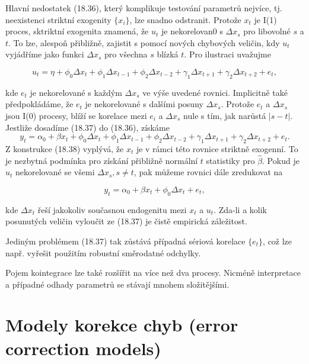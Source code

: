 Hlavní nedostatek (18.36), který komplikuje testování parametrů nejvíce, tj. neexistenci striktní exogenity 
$\{x_i\}$, lze snadno odstranit. Protože $x_t$ je I(1) proces, sktriktní exogenita znamená, že $u_t$ je 
nekorelovan0 s $\Delta x_s$ pro libovolné $s$ a $t$. To lze, alespoň přibližně, zajistit s pomocí nových 
chybových veličin, kdy $u_t$ vyjádříme jako funkci $\Delta x_s$ pro všechna $s$ blízká $t$. Pro ilustraci uvažujme

\begin{equation}
u_t = \eta + \phi_0 \Delta x_t + \phi_1 \Delta x_{t - 1} + \phi_2 \Delta x_{t - 2} + \gamma_1 \Delta x_{t + 1} + \gamma_2 \Delta x_{t + 2} + e_t,
\end{equation}

kde $e_t$ je nekorelované s každým $\Delta x_s$ ve výše uvedené rovnici. Implicitně také předpokládáme, že $e_t$ je nekorelované s 
dalšími posuny $\Delta x_s$. Protože $e_t$ a $\Delta x_s$ jsou I(0) procesy, blíží se korelace mezi $e_i$ a 
$\Delta x_s$ nule s tím, jak narůstá $|s - t|$. Jestliže dosadíme (18.37) do (18.36), získáme
\begin{equation}
y_t = \alpha_0 + \beta x_t + \phi_0 \Delta x_t + \phi_1 \Delta x_{t - 1} + \phi_2 \Delta x_{t - 2} + \gamma_1 \Delta 
x_{t + 1} + \gamma_2 \Delta x_{t + 2} + e_t.
\end{equation}
Z konstrukce (18.38) vyplývá, že $x_t$ je v rámci této rovnice striktně exogenní. To je nezbytná podmínka pro 
získání přibližně normální $t$ statistiky pro $\hat{\beta}$. Pokud je $u_t$ nekorelované se všemi $\Delta 
x_s, s \ne t$, pak můžeme rovnici dále zredukovat na

\begin{equation}
y_t = \alpha_0 + \beta x_t + \phi_0 \Delta x_t + e_t,
\end{equation}

kde $\Delta x_t$ řeší jakokoliv současnou endogenitu mezi $x_t$ a $u_t$. Zda-li a kolik posunutých veličin 
vyloučit ze (18.37) je čistě empirická záležitost.

Jediným problémem (18.37) tak zůstává případná sériová korelace $\{e_t\}$, což lze např. vyřešit použitím 
robustní směrodatné odchylky.

Pojem kointegrace lze také rozšířit na více než dva procesy. Nicméně interpretace a případné odhady parametrů se
stávají mnohem složitějšími.

\section{Modely korekce chyb (error correction models)}

